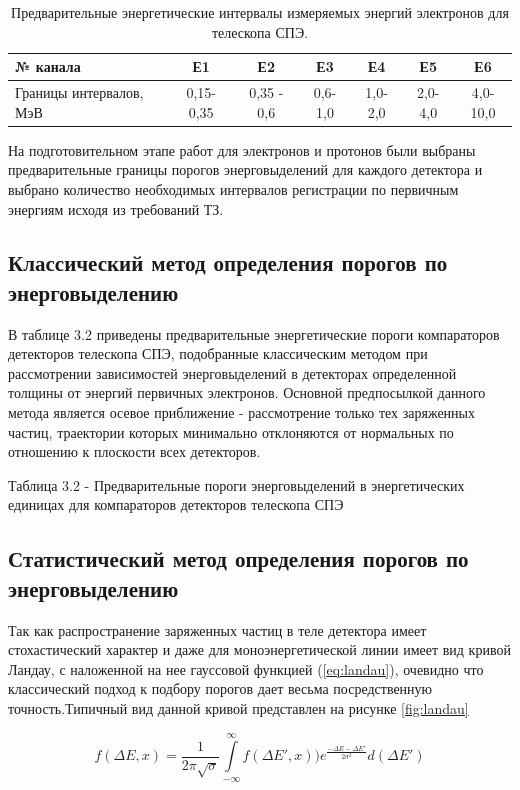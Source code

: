 \begin{table}
	\begin{tabular}{p{4.7cm}|cccccc}
№ канала&	Е1&	Е2&	Е3&	Е4&	Е5&	Е6\\ \hline
Границы интервалов, МэВ&	0,15-0,35&	0,35 - 0,6&	0,6-1,0&	1,0-2,0&	2,0-4,0&	4,0-10,0 
\end{tabular}
	\caption{Предварительные энергетические интервалы измеряемых энергий электронов для телескопа СПЭ.}
	\label{tab:elec_channel}
\end{table} 


На подготовительном этапе работ для электронов и протонов были выбраны предварительные границы порогов энерговыделений для каждого детектора и выбрано количество необходимых интервалов регистрации по первичным энергиям исходя из требований ТЗ. 
\subsection{Классический метод определения порогов по энерговыделению}
В таблице 3.2 приведены предварительные энергетические пороги компараторов детекторов телескопа СПЭ, подобранные классическим методом при рассмотрении зависимостей энерговыделений в детекторах определенной толщины от энергий первичных электронов. Основной предпосылкой данного метода является осевое приближение - рассмотрение только тех заряженных частиц, траектории которых минимально отклоняются от нормальных по отношению к плоскости всех детекторов. 

Таблица 3.2 - Предварительные пороги энерговыделений в энергетических единицах для компараторов детекторов телескопа СПЭ

\subsection{Статистический метод определения порогов по энерговыделению}
Так как распространение заряженных частиц в теле детектора имеет стохастический характер и даже для моноэнергетической линии имеет вид кривой Ландау, с наложенной на нее гауссовой функцией (\ref{eq:landau}), очевидно что классический подход к подбору порогов дает весьма посредственную точность.Типичный вид данной кривой представлен на рисунке \ref{fig:landau}

\begin{equation} \label{eq:landau}
f(\Delta E, x) = \frac{1}{2\pi\sqrt{\sigma}} \int\limits_{-\infty}^{\infty}{f(\Delta E', x))e^{\frac{-\Delta E - \Delta E'}{2\sigma^2}}d(\Delta E')}
\end{equation}

